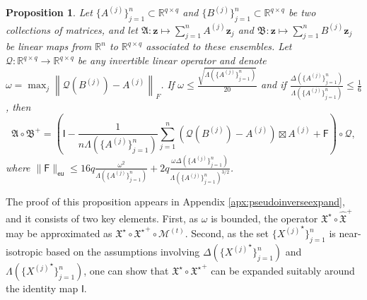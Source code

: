 \documentclass[11pt,letterpaper]{article}
\newtheorem{proposition}[theorem]{Proposition}
\newcommand{\R}{\mathbb{R}}
\newcommand{\bz}{\mathbf{z}}
\newcommand{\xx}{\mathfrak{X}}
\newcommand{\sff}{\mathsf{F}}
\newcommand{\sfi}{\mathsf{I}}
\newcommand{\eu}{\mathsf{eu}}
\newcommand{\coveig}{\Lambda}
\newcommand{\covsup}{\Delta}
\begin{document}
\begin{proposition} \label{thm:structuralresult}
Let $\{A^{(j)}\}_{j=1}^n \subset \R^{q \times q}$ and $\{B^{(j)}\}_{j=1}^n \subset \R^{q \times q}$ be two collections of matrices, and let $\mathfrak{A} : \bz \mapsto \sum_{j=1}^n A^{(j)} \bz_j$ and $\mathfrak{B} : \bz \mapsto \sum_{j=1}^n B^{(j)} \bz_j$ be linear maps from $\R^n$ to $\R^{q \times q}$ associated to these ensembles.  Let $\mathcal{Q} : \R^{q \times q} \rightarrow \R^{q \times q}$ be any invertible linear operator and denote $\omega = \max_j \left\|\mathcal{Q}(B^{(j)})  - A^{(j)} \right\|_F$.  If $\omega \leq \frac{\sqrt{\coveig\!\left(\{A^{(j)}\}_{j=1}^n\right)}}{20}$ and if $\frac{\covsup\!\left(\{A^{(j)}\}_{j=1}^n\right)} {\coveig\!\left(\{A^{(j)}\}_{j=1}^n\right)} \leq \frac{1}{6}$, then
\begin{equation} \label{eq:ensembleofdifferences}
\mathfrak{A} \circ \mathfrak{B}^{+} = \left(\sfi - \frac{1}{n\coveig\!\left(\{A^{(j)}\}_{j=1}^n\right)} \sum_{j=1}^{n} \left(\mathcal{Q}(B^{(j)}) - A^{(j)}\right) \boxtimes A^{(j)} + \sff \right) \circ \mathcal{Q},
\end{equation}
where $\|\sff\|_{\eu} \leq 16 q \frac{\omega^2}{\coveig\!\left(\{A^{(j)}\}_{j=1}^n\right)} + 2 q  \frac{\omega \covsup\!\left(\{A^{(j)}\}_{j=1}^n\right)} {\coveig\!\left(\{A^{(j)}\}_{j=1}^n\right)^{3/2}} $.
\end{proposition}

The proof of this proposition appears in Appendix \ref{apx:pseudoinverseexpand}, and it consists of two key elements.  First, as $\omega$ is bounded, the operator $\xx^\star \circ \hat{\xx}^{+}$ may be approximated as $\xx^\star \circ {\xx^\star}^+ \circ \mathcal{M}^{(t)}$.  Second, as the set $\{{X^{(j)}}^\star\}_{j=1}^n$ is near-isotropic based on the assumptions involving $\Delta\!\left(\{{X^{(j)}}^\star\}_{j=1}^n \right)$ and $\Lambda\!\left(\{{X^{(j)}}^\star\}_{j=1}^n\right)$, one can show that $\xx^\star \circ {\xx^\star}^+$ can be expanded suitably around the identity map $\sfi$.
\end{document}
